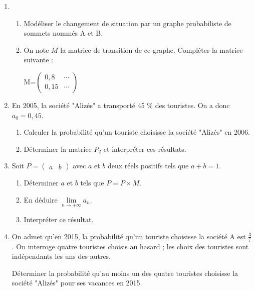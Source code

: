 \begin{enumerate}
     \item
     \begin{enumerate}[label=\alph*.]
          \item
          Modéliser le changement de situation par un graphe probabiliste de sommets nommés A et B.
          \item
          On note $M$ la matrice de transition de ce graphe. Compléter la matrice suivante :
          \par
          M=$\begin{pmatrix} 0,8 & \cdots  \\ 0,15 & \cdots \end{pmatrix}$
     \end{enumerate}
     \item
     En 2005, la société "Alizés" a transporté 45 \% des touristes. On a donc $a_{0}=0,45$.
     \begin{enumerate}[label=\alph*.]
          \item
          Calculer la probabilité qu'un touriste choisisse la société "Alizés" en 2006.
          \item
          Déterminer la matrice $P_{2}$ et interpréter ces résultats.
     \end{enumerate}
     \item
     Soit $P=\begin{pmatrix} a & b \end{pmatrix}$ avec $a$ et $b$ deux réels positifs tels que $a+b=1$.
     \begin{enumerate}[label=\alph*.]
          \item
          Déterminer $a$ et $b$ tels que $P=P \times  M$.
          \item
          En déduire $\lim\limits_{n\rightarrow +\infty }a_{n}$.
          \item
     Interpréter ce résultat.\end{enumerate}
     \item
     On admet qu'en 2015, la probabilité qu'un touriste choisisse la société A est $\frac{3}{7}$ . On interroge quatre touristes choisis au hasard ; les choix des touristes sont indépendants les uns des autres.
     \par
Déterminer la probabilité qu'au moins un des quatre touristes choisisse la société "Alizés" pour ses vacances en 2015.\end{enumerate}
